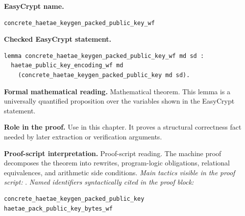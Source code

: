 \begin{formaltheorem}
\noindent\textbf{EasyCrypt name.}
\begin{lstlisting}[language=EasyCrypt,basicstyle=\ttfamily\scriptsize]
concrete_haetae_keygen_packed_public_key_wf
\end{lstlisting}
\noindent\textbf{Checked EasyCrypt statement.}
\begin{lstlisting}[language=EasyCrypt,basicstyle=\ttfamily\scriptsize]
lemma concrete_haetae_keygen_packed_public_key_wf md sd :
  haetae_public_key_encoding_wf md
    (concrete_haetae_keygen_packed_public_key md sd).
\end{lstlisting}
\noindent\textbf{Formal mathematical reading.}
Mathematical theorem. This lemma is a universally quantified proposition over the variables shown in the EasyCrypt statement.

\noindent\textbf{Role in the proof.}
Use in this chapter. It proves a structural correctness fact needed by later extraction or verification arguments.

\noindent\textbf{Proof-script interpretation.}
Proof-script reading. The machine proof decomposes the theorem into rewrites, program-logic obligations, relational equivalences, and arithmetic side conditions.
\emph{Main tactics visible in the proof script:} .
\emph{Named identifiers syntactically cited in the proof block:}
\begin{lstlisting}[language=EasyCrypt,basicstyle=\ttfamily\scriptsize]
concrete_haetae_keygen_packed_public_key
haetae_pack_public_key_bytes_wf
\end{lstlisting}

\end{formaltheorem}

